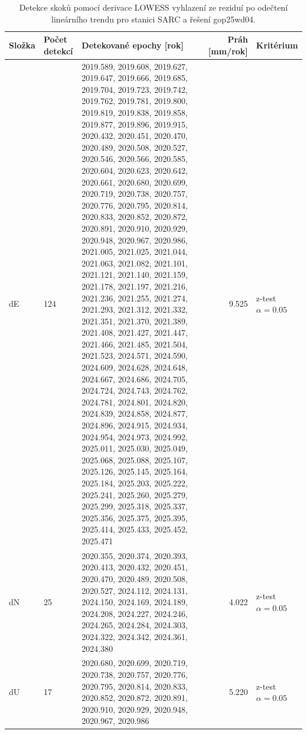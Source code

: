 \begin{table}[htbp]
\caption{Detekce skoků pomocí derivace LOWESS vyhlazení ze reziduí po odečtení lineárního trendu pro stanici SARC a řešení gop25wd04.}
\label{tab:gop25wd04_stcd_sarc_detr_weighted_1seg_jumps_lowess_derivative}
\begin{tabular}{lllrl}
\toprule
Složka & Počet detekcí & Detekované epochy [rok] & Práh [mm/rok] & Kritérium \\
\midrule
dE & 124 & 2019.589, 2019.608, 2019.627, 2019.647, 2019.666, 2019.685, 2019.704, 2019.723, 2019.742, 2019.762, 2019.781, 2019.800, 2019.819, 2019.838, 2019.858, 2019.877, 2019.896, 2019.915, 2020.432, 2020.451, 2020.470, 2020.489, 2020.508, 2020.527, 2020.546, 2020.566, 2020.585, 2020.604, 2020.623, 2020.642, 2020.661, 2020.680, 2020.699, 2020.719, 2020.738, 2020.757, 2020.776, 2020.795, 2020.814, 2020.833, 2020.852, 2020.872, 2020.891, 2020.910, 2020.929, 2020.948, 2020.967, 2020.986, 2021.005, 2021.025, 2021.044, 2021.063, 2021.082, 2021.101, 2021.121, 2021.140, 2021.159, 2021.178, 2021.197, 2021.216, 2021.236, 2021.255, 2021.274, 2021.293, 2021.312, 2021.332, 2021.351, 2021.370, 2021.389, 2021.408, 2021.427, 2021.447, 2021.466, 2021.485, 2021.504, 2021.523, 2024.571, 2024.590, 2024.609, 2024.628, 2024.648, 2024.667, 2024.686, 2024.705, 2024.724, 2024.743, 2024.762, 2024.781, 2024.801, 2024.820, 2024.839, 2024.858, 2024.877, 2024.896, 2024.915, 2024.934, 2024.954, 2024.973, 2024.992, 2025.011, 2025.030, 2025.049, 2025.068, 2025.088, 2025.107, 2025.126, 2025.145, 2025.164, 2025.184, 2025.203, 2025.222, 2025.241, 2025.260, 2025.279, 2025.299, 2025.318, 2025.337, 2025.356, 2025.375, 2025.395, 2025.414, 2025.433, 2025.452, 2025.471 & 9.525 & z-test $\alpha=0.05$ \\
dN & 25 & 2020.355, 2020.374, 2020.393, 2020.413, 2020.432, 2020.451, 2020.470, 2020.489, 2020.508, 2020.527, 2024.112, 2024.131, 2024.150, 2024.169, 2024.189, 2024.208, 2024.227, 2024.246, 2024.265, 2024.284, 2024.303, 2024.322, 2024.342, 2024.361, 2024.380 & 4.022 & z-test $\alpha=0.05$ \\
dU & 17 & 2020.680, 2020.699, 2020.719, 2020.738, 2020.757, 2020.776, 2020.795, 2020.814, 2020.833, 2020.852, 2020.872, 2020.891, 2020.910, 2020.929, 2020.948, 2020.967, 2020.986 & 5.220 & z-test $\alpha=0.05$ \\
\bottomrule
\end{tabular}
\end{table}
